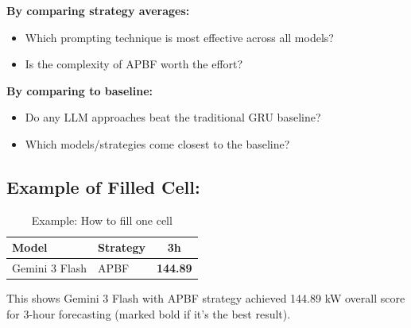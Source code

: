 \documentclass{article}
\begin{document}
\textbf{By comparing strategy averages:}
\begin{itemize}
\item Which prompting technique is most effective across all models?
\item Is the complexity of APBF worth the effort?
\end{itemize}

\textbf{By comparing to baseline:}
\begin{itemize}
\item Do any LLM approaches beat the traditional GRU baseline?
\item Which models/strategies come closest to the baseline?
\end{itemize}

\vspace{0.5cm}

\subsection*{Example of Filled Cell:}

\begin{table}[h!]
\centering
\caption{Example: How to fill one cell}
\begin{tabular}{llc}
\toprule
\textbf{Model} & \textbf{Strategy} & \textbf{3h} \\
\midrule
Gemini 3 Flash & APBF & \textbf{144.89} \\
\bottomrule
\end{tabular}
\end{table}

This shows Gemini 3 Flash with APBF strategy achieved 144.89 kW overall score for 3-hour forecasting (marked bold if it's the best result).
\end{document}
